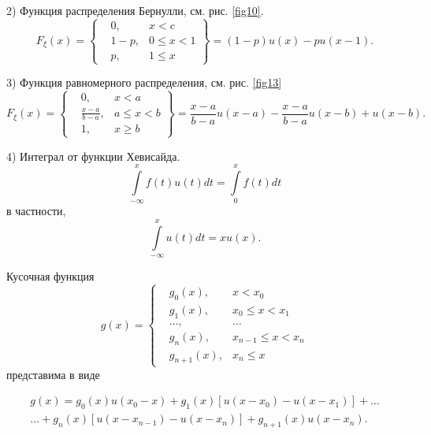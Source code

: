 \begin{example}
2) Функция распределения Бернулли, см. рис. \ref{fig10}.
\begin{equation*}
F_{\xi}(x) = 
  \left\{
 \begin{aligned}
   &0,&x<c\\
   &1-p,&0\leqslant x<1\\
   &p,&1\leqslant x
 \end{aligned}\right\}
 =(1-p)u(x)-pu(x-1).
\end{equation*}

3) Функция равномерного распределения, см. рис. \ref{fig13}
\begin{equation*}
F_{\xi}(x) = 
 \left\{\begin{aligned}
   &0,	&x<a\\
   &\frac{x-a}{b-a},	&a\leqslant x<b\\
   &1,	&x\geqslant b
 \end{aligned}\right\}
 =
 \frac{x-a}{b-a}u(x-a)-\frac{x-a}{b-a}u(x-b)+u(x-b).
\end{equation*}

4) Интеграл от функции Хевисайда.
\begin{equation*}
	\int\limits_{-\infty}^x f(t)u(t)dt=\int\limits_0^xf(t)dt
\end{equation*}
в частности,
\begin{equation*}
	\int\limits_{-\infty}^x u(t)dt=xu(x).
\end{equation*}

\end{example}

\begin{lemma}
\label{lemma:13.3}
	Кусочная функция
\begin{equation*}
	g(x)=
	\left\{\begin{aligned}
		&g_0(x),	&x<x_0 \\
		&g_1(x), 	&x_0\leqslant x<x_1\\
		&\ldots,	&\ldots\\
		&g_n(x),	&x_{n-1}\leqslant x<x_n\\
		&g_{n+1}(x), &x_n\leqslant x
 	\end{aligned}\right.
\end{equation*}
	представима в виде

\begin{gather*}
g(x)=g_0(x)u(x_0-x)+g_1(x)[u(x-x_0)-u(x-x_1)]+\ldots \\
\ldots+g_n(x)[u(x-x_{n-1})-u(x-x_n)]+g_{n+1}(x)u(x-x_n).
\end{gather*}
\end{lemma}

